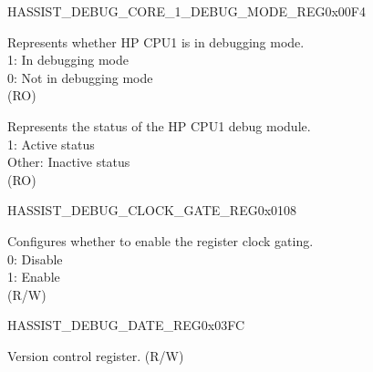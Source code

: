 \begin{register}{H}{ASSIST\_DEBUG\_CORE\_1\_DEBUG\_MODE\_REG}{0x00F4}\label{regdesc:ASSISTDEBUGCORE1DEBUGMODEREG}
%
%
%
\regnewline%
\begin{regdesc}\begin{reglist}
\label{fielddesc:ASSISTDEBUGCORE1DEBUGMODE}\item [ASSIST\_DEBUG\_CORE\_1\_DEBUG\_MODE] Represents whether HP CPU1 is in debugging mode.\\
1: In debugging mode\\
0: Not in debugging mode\\
(RO)
\label{fielddesc:ASSISTDEBUGCORE1DEBUGMODULEACTIVE}\item [ASSIST\_DEBUG\_CORE\_1\_DEBUG\_MODULE\_ACTIVE] Represents the status of the HP CPU1 debug module.\\
1: Active status\\
Other: Inactive status\\
(RO)
\end{reglist}\end{regdesc}
\end{register}


\begin{register}{H}{ASSIST\_DEBUG\_CLOCK\_GATE\_REG}{0x0108}\label{regdesc:ASSISTDEBUGCLOCKGATEREG}
%
%
\regnewline%
\begin{regdesc}\begin{reglist}
\label{fielddesc:ASSISTDEBUGCLKEN}\item [ASSIST\_DEBUG\_CLK\_EN] Configures whether to enable the register clock gating. \\
0: Disable\\
1: Enable\\
(R/W)
\end{reglist}\end{regdesc}
\end{register}


\begin{register}{H}{ASSIST\_DEBUG\_DATE\_REG}{0x03FC}\label{regdesc:ASSISTDEBUGDATEREG}
%
%
\regnewline%
\begin{regdesc}\begin{reglist}
\label{fielddesc:ASSISTDEBUGDATE}\item [ASSIST\_DEBUG\_DATE] Version control register. (R/W)
\end{reglist}\end{regdesc}
\end{register}


